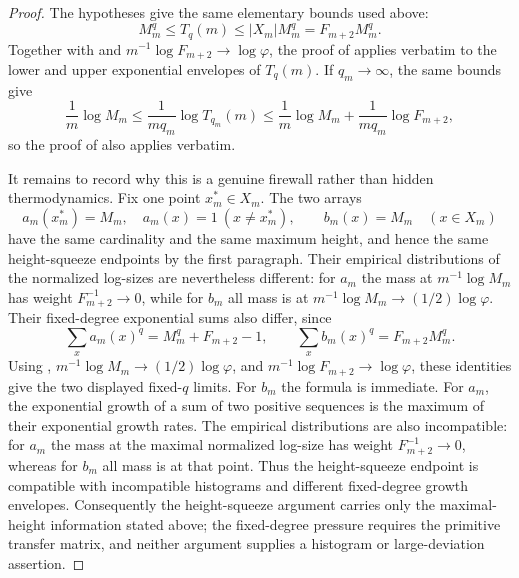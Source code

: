\begin{proof}
The hypotheses give the same elementary bounds used above:
\[
  M_m^q\le T_q(m)\le |X_m|M_m^q=F_{m+2}M_m^q .
\]
Together with  and
\(m^{-1}\log F_{m+2}\to\log\varphi\), the proof of
 applies verbatim to the lower and
upper exponential envelopes of \(T_q(m)\).  If \(q_m\to\infty\), the same bounds
give
\[
  \frac1m\log M_m
  \le \frac{1}{m q_m}\log T_{q_m}(m)
  \le \frac1m\log M_m+\frac{1}{m q_m}\log F_{m+2},
\]
so the proof of  also applies
verbatim.

It remains to record why this is a genuine firewall rather than hidden
thermodynamics.  Fix one point \(x_m^\ast\in X_m\).  The two arrays
\[
  a_m(x_m^\ast)=M_m,\quad a_m(x)=1\ (x\ne x_m^\ast),
  \qquad
  b_m(x)=M_m\quad(x\in X_m)
\]
have the same cardinality and the same maximum height, and hence the same
height-squeeze endpoints by the first paragraph.  Their empirical distributions
of the normalized log-sizes are nevertheless different: for \(a_m\) the mass at
\(m^{-1}\log M_m\) has weight \(F_{m+2}^{-1}\to0\), while for \(b_m\) all mass is
at \(m^{-1}\log M_m\to(1/2)\log\varphi\).  Their fixed-degree exponential sums
also differ, since
\[
  \sum_x a_m(x)^q=M_m^q+F_{m+2}-1,
  \qquad
  \sum_x b_m(x)^q=F_{m+2}M_m^q .
\]
Using ,
\(m^{-1}\log M_m\to(1/2)\log\varphi\), and
\(m^{-1}\log F_{m+2}\to\log\varphi\), these identities give the two displayed
fixed-\(q\) limits.  For \(b_m\) the formula is immediate.  For \(a_m\), the
exponential growth of a sum of two positive sequences is the maximum of their
exponential growth rates.  The empirical distributions are also incompatible:
for \(a_m\) the mass at the maximal normalized log-size has weight
\(F_{m+2}^{-1}\to0\), whereas for \(b_m\) all mass is at that point.  Thus the
height-squeeze endpoint is compatible with incompatible histograms and different
fixed-degree growth envelopes.  Consequently the height-squeeze argument carries
only the maximal-height information stated above; the fixed-degree pressure
requires the primitive transfer matrix, and neither argument supplies a histogram
or large-deviation assertion.
\end{proof}


